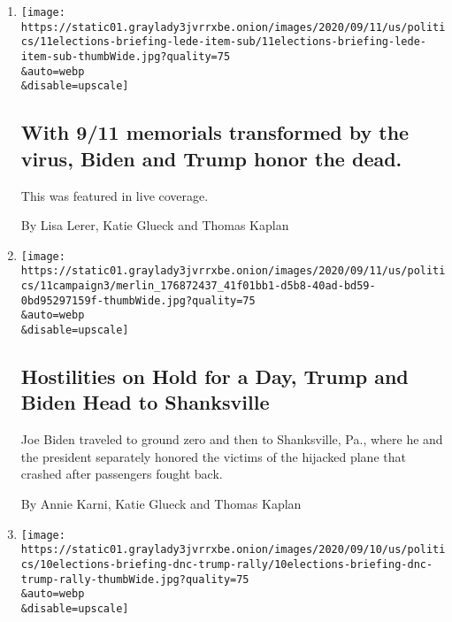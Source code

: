 \begin{enumerate}
\def\labelenumi{\arabic{enumi}.}
\item
  \href{/live/2020/09/11/us/trump-vs-biden/with-9-11-memorials-transformed-by-the-virus-biden-and-trump-honor-the-dead}{}

  \texttt{[image: https://static01.graylady3jvrrxbe.onion/images/2020/09/11/us/politics/11elections-briefing-lede-item-sub/11elections-briefing-lede-item-sub-thumbWide.jpg?quality=75\\\&auto=webp\\\&disable=upscale]}

  \hypertarget{with-911-memorials-transformed-by-the-virus-biden-and-trump-honor-the-dead}{%
  \subsection{With 9/11 memorials transformed by the virus, Biden and
  Trump honor the
  dead.}\label{with-911-memorials-transformed-by-the-virus-biden-and-trump-honor-the-dead}}

  This was featured in live coverage.

  By Lisa Lerer, Katie Glueck and Thomas Kaplan
\item
  \href{/2020/09/11/us/politics/shanksville-trump-biden.html}{}

  \texttt{[image: https://static01.graylady3jvrrxbe.onion/images/2020/09/11/us/politics/11campaign3/merlin\_176872437\_41f01bb1-d5b8-40ad-bd59-0bd95297159f-thumbWide.jpg?quality=75\\\&auto=webp\\\&disable=upscale]}

  \hypertarget{hostilities-on-hold-for-a-day-trump-and-biden-head-to-shanksville}{%
  \subsection{Hostilities on Hold for a Day, Trump and Biden Head to
  Shanksville}\label{hostilities-on-hold-for-a-day-trump-and-biden-head-to-shanksville}}

  Joe Biden traveled to ground zero and then to Shanksville, Pa., where
  he and the president separately honored the victims of the hijacked
  plane that crashed after passengers fought back.

  By Annie Karni, Katie Glueck and Thomas Kaplan
\item
  \href{/2020/09/10/us/elections/democrats-are-sending-a-truck-to-trumps-michigan-rally-to-play-audio-of-his-coronavirus-comments.html}{}

  \texttt{[image: https://static01.graylady3jvrrxbe.onion/images/2020/09/10/us/politics/10elections-briefing-dnc-trump-rally/10elections-briefing-dnc-trump-rally-thumbWide.jpg?quality=75\\\&auto=webp\\\&disable=upscale]}


\end{enumerate}
